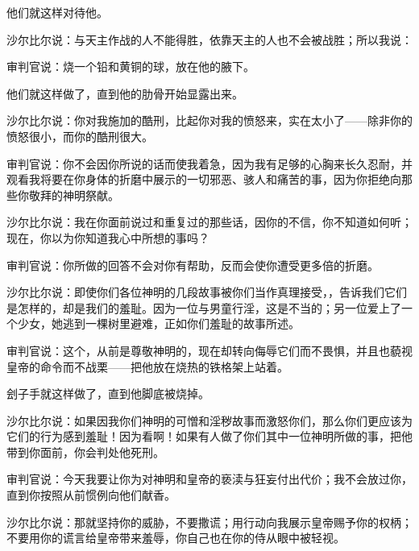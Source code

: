 他们就这样对待他。\par

沙尔比尔说：与天主作战的人不能得胜，依靠天主的人也不会被战胜；所以我说：\par

审判官说：烧一个铅和黄铜的球，放在他的腋下。\par

他们就这样做了，直到他的肋骨开始显露出来。\par

沙尔比尔说：你对我施加的酷刑，比起你对我的愤怒来，实在太小了——除非你的愤怒很小，而你的酷刑很大。\par

审判官说：你不会因你所说的话而使我着急，因为我有足够的心胸来长久忍耐，并观看我将要在你身体的折磨中展示的一切邪恶、骇人和痛苦的事，因为你拒绝向那些你敬拜的神明祭献。\par

沙尔比尔说：我在你面前说过和重复过的那些话，因你的不信，你不知道如何听；现在，你以为你知道我心中所想的事吗？\par

审判官说：你所做的回答不会对你有帮助，反而会使你遭受更多倍的折磨。\par

沙尔比尔说：即使你们各位神明的几段故事被你们当作真理接受，，告诉我们它们是怎样的，却是我们的羞耻。因为一位与男童行淫，这是不当的；另一位爱上了一个少女，她逃到一棵树里避难，正如你们羞耻的故事所述。\par

审判官说：这个，从前是尊敬神明的，现在却转向侮辱它们而不畏惧，并且也藐视皇帝的命令而不战栗——把他放在烧热的铁格架上站着。\par

刽子手就这样做了，直到他脚底被烧掉。\par

沙尔比尔说：如果因我你们神明的可憎和淫秽故事而激怒你们，那么你们更应该为它们的行为感到羞耻！因为看啊！如果有人做了你们其中一位神明所做的事，把他带到你面前，你会判处他死刑。\par

审判官说：今天我要让你为对神明和皇帝的亵渎与狂妄付出代价；我不会放过你，直到你按照从前惯例向他们献香。\par

沙尔比尔说：那就坚持你的威胁，不要撒谎；用行动向我展示皇帝赐予你的权柄；不要用你的谎言给皇帝带来羞辱，你自己也在你的侍从眼中被轻视。\par

